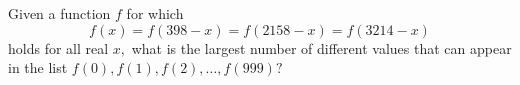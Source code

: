 Given a function $f$ for which
\[f(x)=f(398-x)=f(2158-x)=f(3214-x) \]holds for all real $x,$ what is the largest number of different values that can appear in the list $f(0),f(1),f(2),\ldots,f(999)?$